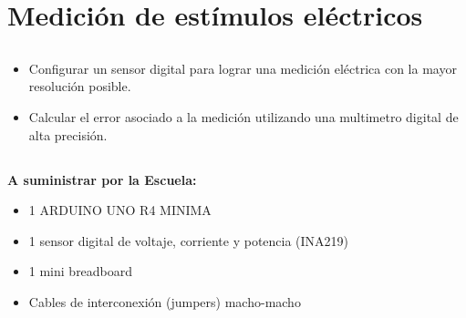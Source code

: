 \chapter{Medición de estímulos eléctricos}
\section{\obj}
\capacidad
\begin{itemize}
    \item Configurar un sensor digital para lograr una medición eléctrica con la mayor resolución posible.
    \item Calcular el error asociado a la medición utilizando una multimetro digital de alta precisión.
\end{itemize}

\section{\mat}
\textbf{A suministrar por la Escuela:}
\begin{itemize}
    \item 1 ARDUINO UNO R4 MINIMA
    \item 1 sensor digital de voltaje, corriente y potencia (INA219)
    \item 1 mini breadboard
    \item Cables de interconexión (jumpers) macho-macho
\end{itemize}

